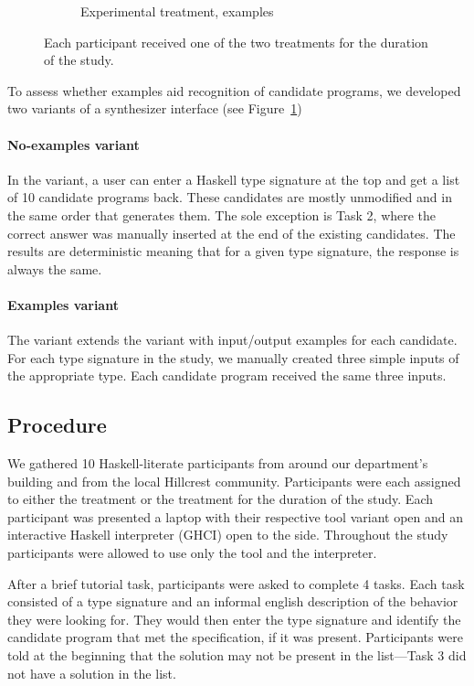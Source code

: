 \begin{figure}[t!]
\begin{subfigure}[t]{0.5\textwidth}
        \caption{Experimental treatment, examples}
    \end{subfigure}
    \caption{Each participant received one of the two treatments for the duration of the study.}
    \label{fig:ui}
\end{figure}
To assess whether examples aid recognition of candidate programs, we
developed two variants of a synthesizer interface (see Figure~\ref{fig:ui})

\paragraph{No-examples variant}
%
In the \noexamples variant, a user can enter a Haskell type signature at the top and get a
list of 10 candidate programs back.
%
These candidates are mostly unmodified and in the same order that \hoogleplus
generates them.
%
The sole exception is Task 2, where the correct answer was manually inserted at
the end of the existing candidates.
%
The results are deterministic meaning that for a given type signature, the
response is always the same.

\paragraph{Examples variant}
The \examples variant extends the \noexamples variant with input/output
examples for each candidate.
%
For each type signature in the study, we manually created three simple
inputs of the appropriate type.
%
Each candidate program received the same three inputs.


\subsection{Procedure}
We gathered 10 Haskell-literate participants from around our department's
building and from the local Hillcrest community.
%
Participants were each assigned to either the \noexamples treatment or the
\examples treatment for the duration of the study.
%
Each participant was presented a laptop with their respective tool variant open
and an interactive Haskell interpreter (GHCI) open to the side.
%
Throughout the study participants were allowed to use only the tool and the
interpreter.

After a brief tutorial task, participants were asked to complete 4 tasks.
%
Each task consisted of a type signature and an informal
english description of the behavior they were looking for.
%
They would then enter the type signature and identify the candidate program that
met the specification, if it was present.
%
Participants were told at the beginning that the solution may not be present
in the list---Task 3 did not have a solution in the list.

